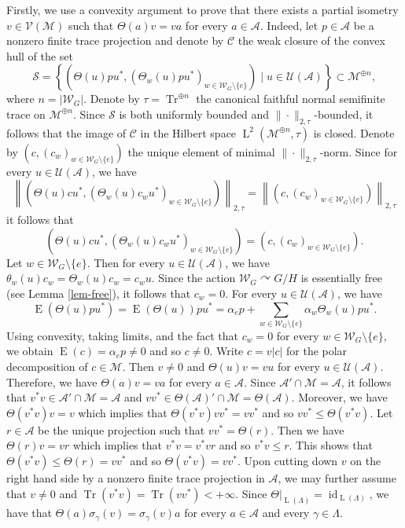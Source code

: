 \documentclass[11pt]{amsart}
\numberwithin{equation}{section}
\theoremstyle{plain}
\theoremstyle{definition}
\newcommand{\Tr}{\operatorname{Tr}}
\newcommand{\id}{\operatorname{id}}
\newcommand{\rE}{\operatorname{ E}}
\newcommand{\rL}{\operatorname{ L}}
\begin{document}
Firstly, we use a convexity argument to prove that there exists a partial isometry $v \in \mathscr V(\mathscr M)$ such that $\Theta (a) v = v a $ for every $a \in \mathscr A$. Indeed, let $p \in \mathscr A$ be a nonzero finite trace projection and denote by $\mathscr C$ the weak closure of the convex hull of the set
$$\mathscr S = \left \{ \left(\Theta(u) p u^*, (\Theta_w(u) p u^*)_{w \in \mathscr W_G\setminus \{e\}}\right) \mid u \in \mathscr U(\mathscr A)\right \} \subset \mathscr M^{\oplus n},$$ 
where $n = |\mathscr W_G|$. Denote by $\tau = \Tr^{\oplus n}$ the canonical faithful normal semifinite trace on $\mathscr M^{\oplus n}$. Since $\mathscr S$ is both uniformly bounded and $\|\cdot\|_{2, \tau}$-bounded, it follows that the image of $\mathscr C$ in the Hilbert space $\rL^2(\mathscr M^{\oplus n}, \tau)$ is closed. Denote by $(c, (c_w)_{w \in \mathscr W_G\setminus \{e\}})$ the unique element of minimal $\|\cdot\|_{2, \tau}$-norm. Since for every $u \in \mathscr U(\mathscr A)$, we have
$$\left\| \left(\Theta(u)cu^*, (\Theta_w(u)c_wu^*)_{w \in \mathscr W_G\setminus \{e\}} \right) \right\|_{2, \tau} = \left\| \left(c, (c_w)_{w \in \mathscr W_G\setminus \{e\}} \right)\right\|_{2, \tau}$$
it follows that 
$$\left(\Theta(u)cu^*, (\Theta_w(u)c_wu^*)_{w \in \mathscr W_G\setminus \{e\}} \right) = \left(c, (c_w)_{w \in \mathscr W_G \setminus \{e\}} \right).$$
Let $w \in \mathscr W_G\setminus \{e\}$. Then for every $u \in \mathscr U(\mathscr A)$, we have $\theta_w(u)c_w = \Theta_w(u)c_w = c_w u$. Since the action $\mathscr W_G \curvearrowright G/H$ is essentially free (see Lemma \ref{lem-free}), it follows that $c_w = 0$. For every $u \in \mathscr U(\mathscr A)$, we have 
$$\rE(\Theta(u)p u^*) = \rE(\Theta(u)) p u^* = \alpha_e p + \sum_{w \in \mathscr W_G\setminus \{e\}} \alpha_w\Theta_w(u) p u^*.$$
Using convexity, taking limits, and the fact that $c_w = 0$ for every $w \in \mathscr W_G \setminus \{e\}$, we obtain $\rE(c) = \alpha_e p \neq 0$ and so $c \neq 0$. Write $c = v |c|$ for the polar decomposition of $c \in \mathscr M$. Then $v \neq 0$ and $\Theta(u)v = v u$ for every $u \in \mathscr U(\mathscr A)$. Therefore, we have $\Theta(a)v = va$ for every $a \in \mathscr A$. Since $\mathscr A' \cap \mathscr M = \mathscr A$, it follows that $v^*v \in \mathscr A' \cap \mathscr M = \mathscr A$ and $vv^* \in \Theta(\mathscr A)' \cap \mathscr M =\Theta(\mathscr A)$. Moreover, we have $\Theta(v^*v) v = v$ which implies that $\Theta(v^*v)vv^* = vv^*$ and so $vv^* \leq \Theta(v^*v)$. Let $r \in \mathscr A$ be the unique projection such that $vv^* = \Theta(r)$. Then we have $\Theta(r) v = v r$ which implies that $v^*v = v^*v r$ and so $v^*v \leq r$. This shows that $\Theta(v^*v) \leq \Theta(r) = vv^*$ and so $\Theta(v^*v) = vv^*$. Upon cutting down $v$ on the right hand side by a nonzero finite trace projection in $\mathscr A$, we may further assume that $v \neq 0$ and $\Tr(v^*v) = \Tr(vv^*) < +\infty$. Since $\Theta|_{\rL(\Lambda)} = \id_{\rL(\Lambda)}$, we have that $\Theta(a)\sigma_\gamma(v) = \sigma_\gamma(v) a$ for every $a \in \mathscr A$ and every $\gamma \in \Lambda$. 
\end{document}
